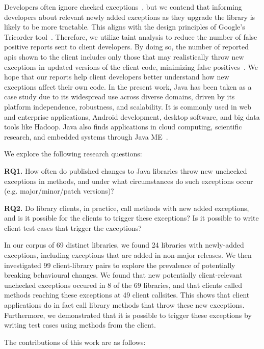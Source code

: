Developers often ignore checked exceptions~\cite{nakshatri16:_analy_java}, but we contend that informing developers about relevant newly added exceptions as they upgrade the library is likely to be more tractable. This aligns with the design principles of Google’s Tricorder tool~\cite{sadowski15:_tricor}. Therefore, we utilize taint analysis to reduce the number of false positive reports sent to client developers. By doing so, the number of reported \gls{api}s shown to the client includes only those that may realistically throw new exceptions in updated versions of the client code, minimizing false positives~\cite{pashchenko20:_vuln4,pashchenko18:_vulner}. We hope that our reports help client developers better understand how new exceptions affect their own code. In the present work, Java has been taken as a case study due to its widespread
use across diverse domains, driven by its platform independence, robustness, and scalability. It is commonly used in web and enterprise applications, Android development,
desktop software, and big data tools like Hadoop. Java also finds applications in cloud
computing, scientific research, and embedded systems through Java ME~\cite{StromO2003Otuo}.


\newpage
We explore the following research questions:

\noindent
{\bf RQ1.} How often do published changes to Java libraries throw new unchecked exceptions in methods,
and under what circumstances do such exceptions occur (e.g. major/minor/patch versions)?

\noindent
{\bf RQ2.} Do library clients, in practice, call methods with new added exceptions, and is it possible for the clients to trigger these exceptions? Is it possible to write client test cases that trigger the exceptions?

In our corpus of 69 distinct libraries, we found 24 libraries with newly-added exceptions, including exceptions that are added in non-major releases.
We then investigated 99 client-library pairs to explore the prevalence of potentially breaking behavioural changes.
We found that new potentially client-relevant unchecked exceptions occured in 8 of the 69 libraries, and that clients called methods reaching these exceptions at 49 client callsites.
This shows that client applications do in fact call library methods that throw these new exceptions.
Furthermore, we demonstrated that it is possible to trigger these exceptions by writing test cases using methods from the client.

The contributions of this work are as follows:

